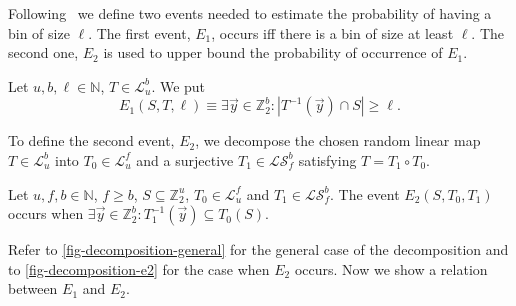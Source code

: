 \documentclass[unicode,review]{siamart1116}
\newcommand{\vecspace}[2]{\mathbb{Z}_{#1}^{#2}}
\newcommand{\binvecspace}[1]{\vecspace{2}{#1}}
\newcommand{\linearmaps}[2]{\mathcal{L}_{#1}^{#2}}
\newcommand{\surjectivelinearmaps}[2]{\mathcal{LS}_{#1}^{#2}}
\numberwithin{theorem}{section}
\begin{document}
Following~\cite{alonetal} we define two events needed to estimate the probability of having a  bin of size $\ell$. 
The first event, $E_1$, occurs iff there is a bin of size at least $\ell$.
The second one, $E_2$ is used to upper bound the probability of occurrence of $E_1$.
\begin{definition}
Let $u, b, \ell \in \mathbb{N}$, $T \in \linearmaps{u}{b}$. We put \[E_1(S, T, \ell) \equiv \exists \vec{y} \in \binvecspace{b} \colon |T^{-1}(\vec y) \cap S| \geq \ell.\]
\end{definition}

To define the second event, $E_2$, we decompose the chosen random linear map $T \in \linearmaps{u}{b}$ into $T_0 \in \linearmaps{u}{f}$ and a surjective $T_1 \in \surjectivelinearmaps{f}{b}$ satisfying $T = T_1 \circ T_0$.

\begin{definition}
Let $u, f, b \in \mathbb{N}$, $f \geq b$, $S \subseteq \binvecspace{u}$, $T_0 \in \linearmaps{u}{f}$ and $T_1 \in \surjectivelinearmaps{f}{b}$.
The event $E_2(S, T_0, T_1)$ occurs when $\exists \vec{y} \in \binvecspace{b} \colon T_1^{-1}(\vec y) \subseteq T_0(S)$.
\end{definition}

Refer to \cref{fig-decomposition-general} for the general case of the decomposition and to \cref{fig-decomposition-e2} for the case when $E_2$ occurs. 
Now we show a relation between $E_1$ and $E_2$.
\end{document}

